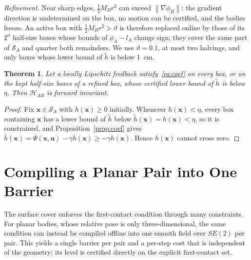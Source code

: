 \documentclass[journal]{IEEEtran}
\newtheorem{theorem}{Theorem}
\theoremstyle{definition}
\newcommand{\norm}[1]{\left\lVert #1\right\rVert}
\begin{document}
\emph{Refinement.} Near sharp edges, $\frac12M_Br^2$ can exceed $\norm{\nabla\phi_B}$: the gradient
direction is undetermined on the box, no motion can be certified, and the bodies freeze. An active box
with $\frac12M_Br^2>\vartheta$ is therefore replaced online by those of its $2^n$ half-size boxes whose
bounds of $\phi_A-l_A$ change sign; they cover the same part of $\mathcal S_A$ and quarter both
remainders. We use $\vartheta=0.1$, at most two halvings, and only boxes whose lower bound of $\tilde h$
is below 1~cm.
\begin{theorem}\label{thm:invariance}
Let a locally Lipschitz feedback satisfy~\eqref{eq:coef} on every box, or on the kept half-size boxes of
a refined box, whose certified lower bound of $\tilde h$ is below $\eta$. Then $\mathcal H_{AB}$ is
forward invariant.
\end{theorem}
\begin{proof}
Fix $\mathbf x\in\mathcal S_A$ with $h(\mathbf x)\ge0$ initially. Whenever $h(\mathbf x)<\eta$, every
box containing $\mathbf x$ has a lower bound of $\tilde h$ below $\tilde h(\mathbf x)=h(\mathbf x)<\eta$,
so it is constrained, and Proposition~\ref{prop:coef} gives
$\dot h(\mathbf x)=\Psi(\mathbf x,\mathbf u)-\gamma h(\mathbf x)\ge-\gamma h(\mathbf x)$. Hence
$h(\mathbf x)$ cannot cross zero.
\end{proof}

\section{Compiling a Planar Pair into One Barrier}\label{sec:tab}
The surface cover enforces the first-contact condition through many constraints. For planar
bodies, whose relative pose is only three-dimensional, the same condition can instead be compiled
offline into one smooth field over $SE(2)$ per pair. This yields a single barrier per pair and a
per-step cost that is independent of the geometry; its level is certified directly on the explicit
first-contact set.
\end{document}
